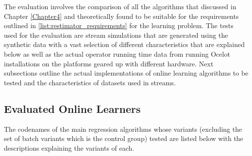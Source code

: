 The evaluation involves the comparison of all the algorithms that discussed in Chapter \ref{Chapter4} and theoretically found to be suitable for the requirements outlined in \ref{list:restimator_requirements} for the learning problem. The tests used for the evaluation are stream simulations that are generated using the synthetic data with a vast selection of different characteristics that are explained below as well as the actual operator running time data from running Ocelot installations on the platforms geared up with different hardware. Next subsections outline the actual implementations of online learning algorithms to be tested and the characteristics of datasets used in streams.

\subsection{Evaluated Online Learners}

The codenames of the main regression algorithms whose variants (excluding the set of batch variants which is the control group) tested are listed below with the descriptions explaining the variants of each.

